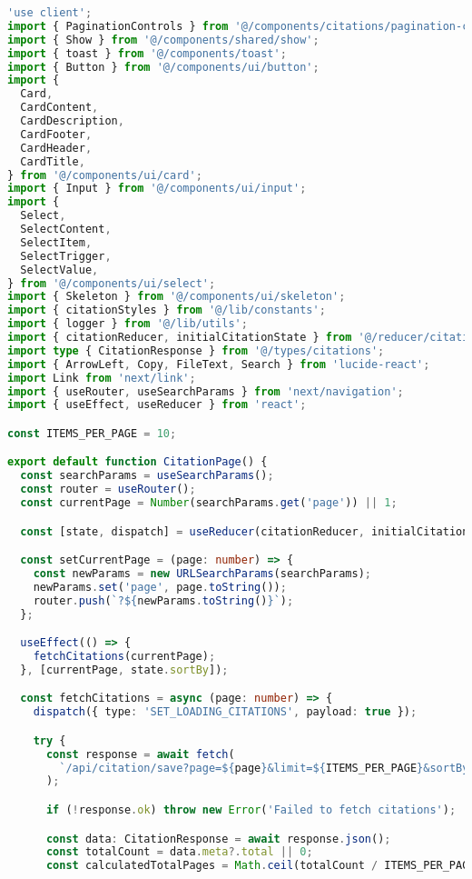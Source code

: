 \begin{lstlisting}[language=TypeScript, caption={Pembuatan Sitasi}, inputencoding=utf8]
'use client';
import { PaginationControls } from '@/components/citations/pagination-control';
import { Show } from '@/components/shared/show';
import { toast } from '@/components/toast';
import { Button } from '@/components/ui/button';
import {
  Card,
  CardContent,
  CardDescription,
  CardFooter,
  CardHeader,
  CardTitle,
} from '@/components/ui/card';
import { Input } from '@/components/ui/input';
import {
  Select,
  SelectContent,
  SelectItem,
  SelectTrigger,
  SelectValue,
} from '@/components/ui/select';
import { Skeleton } from '@/components/ui/skeleton';
import { citationStyles } from '@/lib/constants';
import { logger } from '@/lib/utils';
import { citationReducer, initialCitationState } from '@/reducer/citation';
import type { CitationResponse } from '@/types/citations';
import { ArrowLeft, Copy, FileText, Search } from 'lucide-react';
import Link from 'next/link';
import { useRouter, useSearchParams } from 'next/navigation';
import { useEffect, useReducer } from 'react';

const ITEMS_PER_PAGE = 10;

export default function CitationPage() {
  const searchParams = useSearchParams();
  const router = useRouter();
  const currentPage = Number(searchParams.get('page')) || 1;

  const [state, dispatch] = useReducer(citationReducer, initialCitationState);

  const setCurrentPage = (page: number) => {
    const newParams = new URLSearchParams(searchParams);
    newParams.set('page', page.toString());
    router.push(`?${newParams.toString()}`);
  };

  useEffect(() => {
    fetchCitations(currentPage);
  }, [currentPage, state.sortBy]);

  const fetchCitations = async (page: number) => {
    dispatch({ type: 'SET_LOADING_CITATIONS', payload: true });

    try {
      const response = await fetch(
        `/api/citation/save?page=${page}&limit=${ITEMS_PER_PAGE}&sortBy=${state.sortBy}`,
      );

      if (!response.ok) throw new Error('Failed to fetch citations');

      const data: CitationResponse = await response.json();
      const totalCount = data.meta?.total || 0;
      const calculatedTotalPages = Math.ceil(totalCount / ITEMS_PER_PAGE);


\end{lstlisting}
